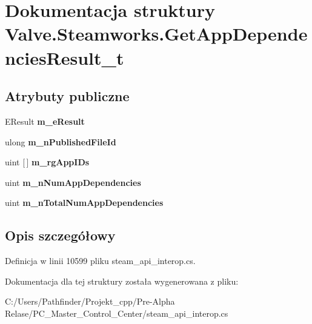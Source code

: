 \hypertarget{struct_valve_1_1_steamworks_1_1_get_app_dependencies_result__t}{}\section{Dokumentacja struktury Valve.\+Steamworks.\+Get\+App\+Dependencies\+Result\+\_\+t}
\label{struct_valve_1_1_steamworks_1_1_get_app_dependencies_result__t}
\subsection*{Atrybuty publiczne}
\begin{DoxyCompactItemize}
\item 
\mbox{\label{struct_valve_1_1_steamworks_1_1_get_app_dependencies_result__t_a6cac859542cd87e490d5cbeaa8289980}} 
E\+Result {\bfseries m\+\_\+e\+Result}
\item 
\mbox{\label{struct_valve_1_1_steamworks_1_1_get_app_dependencies_result__t_a07629f08088ae894cebe79096f062919}} 
ulong {\bfseries m\+\_\+n\+Published\+File\+Id}
\item 
\mbox{\label{struct_valve_1_1_steamworks_1_1_get_app_dependencies_result__t_ac209e5ceb5503ebce98720fcce330f81}} 
uint \mbox{[}$\,$\mbox{]} {\bfseries m\+\_\+rg\+App\+I\+Ds}
\item 
\mbox{\label{struct_valve_1_1_steamworks_1_1_get_app_dependencies_result__t_aa3096bbc31ef69bbceeb6e4b506bace3}} 
uint {\bfseries m\+\_\+n\+Num\+App\+Dependencies}
\item 
\mbox{\label{struct_valve_1_1_steamworks_1_1_get_app_dependencies_result__t_af24d4ad142ac992157e152cd822916b8}} 
uint {\bfseries m\+\_\+n\+Total\+Num\+App\+Dependencies}
\end{DoxyCompactItemize}


\subsection{Opis szczegółowy}


Definicja w linii 10599 pliku steam\+\_\+api\+\_\+interop.\+cs.



Dokumentacja dla tej struktury została wygenerowana z pliku\+:\begin{DoxyCompactItemize}
\item 
C\+:/\+Users/\+Pathfinder/\+Projekt\+\_\+cpp/\+Pre-\/\+Alpha Relase/\+P\+C\+\_\+\+Master\+\_\+\+Control\+\_\+\+Center/steam\+\_\+api\+\_\+interop.\+cs\end{DoxyCompactItemize}
